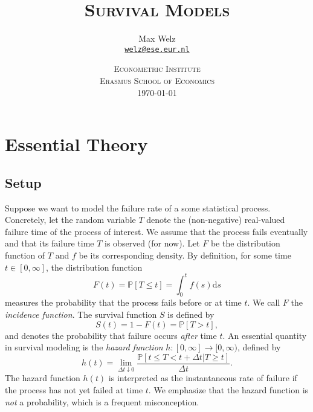 \documentclass[11pt]{article}
\title{\textsc{Survival Models}}
\author{Max Welz \\
  \href{mailto:welz@ese.eur.nl}{\texttt{welz@ese.eur.nl}}}
\date{%
    \textsc{Econometric Institute\\ Erasmus School of Economics}\\[2ex]%
    \today}
\renewcommand{\P}{\mathbb{P}}
\renewcommand{\d}{\text{d}}
\begin{document}
\maketitle

\section{Essential Theory}
\subsection{Setup}
Suppose we want to model the failure rate of a some statistical process. Concretely, let the random variable $T$ denote the (non-negative) real-valued failure time of the process of interest. We assume that the process fails eventually and that its failure time $T$ is observed (for now). Let $F$ be the distribution function of $T$ and $f$ be its corresponding density. By definition, for some time $t\in[0, \infty]$, the distribution function
\[
    F(t) = \P[T \leq t]
    =
    \int_0^t f(s)\d s
\]
measures the probability that the process fails before or at time $t$. We call $F$ the \textit{incidence function}. The survival function $S$ is defined by
\[
    S(t) = 1 - F(t) = \P[T > t],
\]
and denotes the probability that failure occurs \textit{after} time $t$. An essential quantity in survival modeling is the \textit{hazard function} $h:[0,\infty]\to[0,\infty)$, defined by
\begin{equation}\label{eq:hazard}
    h(t) = \lim_{\Delta t\downarrow 0}\frac{\P[t \leq T < t + \Delta t| T \geq t]}{\Delta t}.
\end{equation}
The hazard function $h(t)$ is interpreted as the instantaneous rate of failure if the process has not yet failed at time $t$. We emphasize that the hazard function is \textit{not} a probability, which is a frequent misconception.
\end{document}

